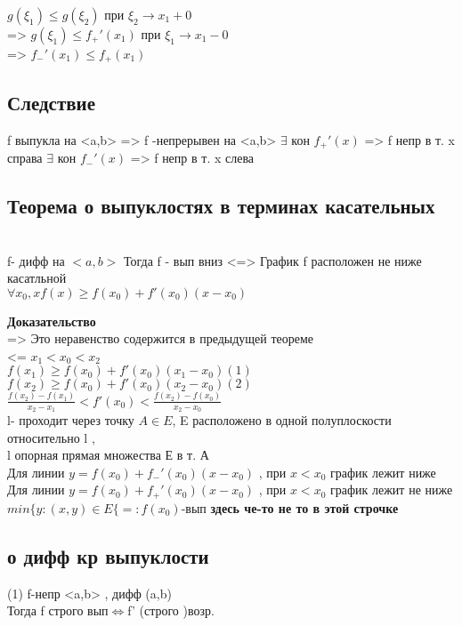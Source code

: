 \documentclass[12pt, a4paper]{article}
\newcommand{\nl}{\newline}
\begin{document}
  $g(\xi_{1}) \leq g(\xi_{2})$ при $\xi_{2} \rightarrow x_1 + 0$ \\
 => $g(\xi_{1}) \leq f_{+}'(x_{1})$ при $\xi_1 \rightarrow x_1 - 0$ \\
 => $f_{-}'(x_1)  \leq f_{+}(x_{1})$  \\
 
\subsection{Следствие} 
   f выпукла на <a,b> => f -непрерывен на <a,b> \nl
   $\exists$ кон  $f_{+}'(x)$ => f непр в т. x справа \nl
   $\exists$ кон  $f_{-}'(x)$ => f непр в т. x слева \nl
 
\subsection{Теорема о выпуклостях в терминах касательных} \\
   f- дифф на $<a,b>$ \nl
   Тогда f - вып вниз <=> График  f расположен не ниже касатльной \\
   $\forall x_{0},x f(x) \geq f(x_{0}) +f'(x_{0})(x-x_{0})$ \nl
   
\textbf{Доказательство} \\
   => Это неравенство содержится в предыдущей теореме \\
   <= $x_{1}< x_{0} < x_{2}$ \\
  $ f(x_{1})\geq f(x_{0})+f'(x_{0})(x_{1}-x_{0}) (1)$ \\
   $f(x_{2})\geq f(x_{0})+f'(x_{0})(x_{2}-x_{0}) (2)$ \\
    $\frac{f(x_2)-f(x_1)}{x_2-x_1} <f'(x_0)<\frac{f(x_2)-f(x_0)}{x_2-x_0}$   \\
 
 
l- проходит через точку $A \in E$, E расположено в одной полуплоскости относительно l ,\\
l опорная прямая множества Е в т. А\\
Для линии $y=f(x_0)+f_-'(x_0)(x-x_0)$ , при $x<x_0$ график лежит ниже  \\
Для линии $y=f(x_0)+f_+'(x_0)(x-x_0)$ , при $x<x_0$ график лежит не ниже \\
  $min\lbrace y:(x,y)\in E \lbrace =: f(x_0) $-вып \textbf{здесь че-то не то в этой строчке} \\
   \subsection{о дифф кр выпуклости}
  (1) f-непр <a,b> , дифф (a,b) \\
  Тогда  f  строго вып$ \Longleftrightarrow $f' (строго )возр. \\
  
\end{document}
